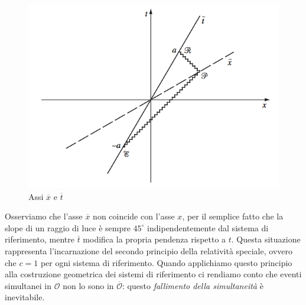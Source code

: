\documentclass[a4paper,11pt]{book}
\theoremstyle{plain}
\theoremstyle{definition}
\begin{document}
\begin{figure}[!h]
\centering
\includegraphics[scale=0.45]{assi}
\caption{Assi $\overline{x}$ e $\overline{t}$}
\end{figure}
Osserviamo che l'asse $\overline{x}$ non coincide con l'asse $x$, per il semplice fatto che la slope di un raggio di luce è sempre $45^{\circ}$ indipendentemente dal sistema di riferimento, mentre $\overline{t}$ modifica la propria pendenza rispetto a $t$. Questa situazione rappresenta l'incarnazione del secondo principio della relatività speciale, ovvero che $c=1$ per ogni sistema di riferimento. Quando applichiamo questo principio alla costruzione geometrica dei sistemi di riferimento ci rendiamo conto che eventi simultanei in $\mathcal{O}$ non lo sono in $\overline{\mathcal{O}}$: questo \emph{fallimento della simultaneità} è inevitabile.    
\end{document}
